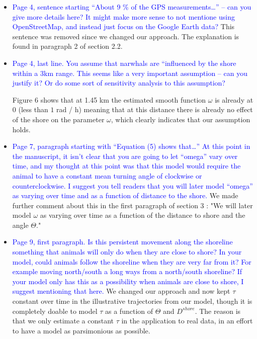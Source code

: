 \documentclass{amsart}
\theoremstyle{plain}
\theoremstyle{remark}
\newcommand {\1}{\mathbb{1}}
\begin{document}
\begin{itemize}
    \item \textcolor{blue}{Page 4, sentence starting “About 9 \% of the GPS measurements…” – can you give more details here?  It might make more sense to not mentione using OpenStreetMap, and instead just focus on the Google Earth data?} This sentence was removed since we changed our approach. The explanation is found in paragraph 2 of section 2.2.

    \item \textcolor{blue}{Page 4, last line.  You assume that narwhals are “influenced by the shore within a 3km range.  This seems like a very important assumption – can you justify it?  Or do some sort of sensitivity analysis to this assumption?}

    Figure 6 shows that at 1.45 km the estimated smooth function $\omega$ is already at 0 (less than $1$ rad / h) meaning that at this distance there is already no effect of the shore on the parameter $\omega$, which clearly indicates that our assumption holds.

    \item \textcolor{blue}{Page 7, paragraph starting with “Equation (5) shows that…”  At this point in the manuscript, it isn’t clear that you are going to let “omega” vary over time, and my thought at this point was that this model would require the animal to have a constant mean turning angle of clockwise or counterclockwise.  I suggest you tell readers that you will later model “omega” as varying over time and as a function of distance to the shore.   }
    We made further comment about this in the first paragraph of section 3 : "We will later model $\omega$ as varying over time as a function of the distance to shore and the angle $\Theta$."

    \item \textcolor{blue}{
    Page 9, first paragraph.  Is this persistent movement along the shoreline something that animals will only do when they are close to shore?  In your model, could animals follow the shoreline when they are very far from it?  For example moving north/south a long ways from a north/south shoreline?  If your model only has this as a possibility when animals are close to shore, I suggest mentioning that here.}
    We changed our approach and now kept $\tau$ constant over time in the illustrative trajectories from our model, though it is completely doable to model $\tau$ as a function of $\Theta$ and $D^{shore}$. The reason is that we only estimate a constant $\tau$ in the application to real data, in an effort to have a model as parsimonious as possible.


\end{itemize}
\end{document}
